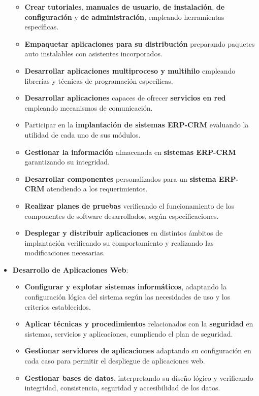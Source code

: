 \begin{itemize}
\begin{itemize}
        \item\textbf{ Crear tutoriales},\textbf{ manuales de usuario}, \textbf{de instalación},\textbf{ de configuración} y \textbf{de administración}, empleando herramientas específicas.
        \item \textbf{Empaquetar aplicaciones para su distribución} preparando paquetes auto instalables con asistentes incorporados.
        \item \textbf{Desarrollar aplicaciones multiproceso y multihilo} empleando librerías y técnicas de programación específicas.
        \item \textbf{Desarrollar aplicaciones} capaces de ofrecer \textbf{servicios en red} empleando mecanismos de comunicación.
        \item Participar en la \textbf{implantación de sistemas ERP-CRM} evaluando la utilidad de cada uno de sus módulos.
        \item \textbf{Gestionar la información} almacenada en \textbf{sistemas ERP-CRM} garantizando su integridad.
        \item \textbf{Desarrollar componentes} personalizados para un \textbf{sistema ERP-CRM} atendiendo a los requerimientos.
        \item \textbf{Realizar planes de pruebas} verificando el funcionamiento de los componentes de software desarrollados, según especificaciones.
        \item \textbf{Desplegar y distribuir aplicaciones} en distintos ámbitos de implantación verificando su comportamiento y realizando las modificaciones necesarias.
    \end{itemize}
    \item \textbf{Desarrollo de Aplicaciones Web}:
    \begin{itemize}
        \item \textbf{Configurar y explotar sistemas informáticos}, adaptando la configuración lógica del sistema según las necesidades de uso y los criterios establecidos.
        \item \textbf{Aplicar técnicas y procedimientos} relacionados con la \textbf{seguridad} en sistemas, servicios y aplicaciones, cumpliendo el plan de seguridad.
        \item \textbf{Gestionar servidores de aplicaciones} adaptando su configuración en cada caso para permitir el despliegue de aplicaciones web.
        \item \textbf{Gestionar bases de datos}, interpretando su diseño lógico y verificando integridad, consistencia, seguridad y accesibilidad de los datos.

\end{itemize}
\end{itemize}
